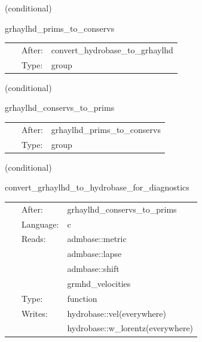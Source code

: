 \vspace{5mm}

   (conditional) 

\hspace{5mm} grhaylhd\_prims\_to\_conservs 

\hspace{5mm}{\it compute conservative variables from primitives } 


\hspace{5mm}

 \begin{tabular*}{160mm}{cll} 
~ & After:  & convert\_hydrobase\_to\_grhaylhd \\ 
~ & Type:  & group \\ 
\end{tabular*} 


\vspace{5mm}

   (conditional) 

\hspace{5mm} grhaylhd\_conservs\_to\_prims 

\hspace{5mm}{\it compute primitive variables from conservatives } 


\hspace{5mm}

 \begin{tabular*}{160mm}{cll} 
~ & After:  & grhaylhd\_prims\_to\_conservs \\ 
~ & Type:  & group \\ 
\end{tabular*} 


\vspace{5mm}

   (conditional) 

\hspace{5mm} convert\_grhaylhd\_to\_hydrobase\_for\_diagnostics 

\hspace{5mm}{\it convert grhaylhd-native variables to hydrobase } 


\hspace{5mm}

 \begin{tabular*}{160mm}{cll} 
~ & After:  & grhaylhd\_conservs\_to\_prims \\ 
~ & Language:  & c \\ 
~ & Reads:  & admbase::metric \\ 
~& ~ &admbase::lapse\\ 
~& ~ &admbase::shift\\ 
~& ~ &grmhd\_velocities\\ 
~ & Type:  & function \\ 
~ & Writes:  & hydrobase::vel(everywhere) \\ 
~& ~ &hydrobase::w\_lorentz(everywhere)\\ 
\end{tabular*} 


